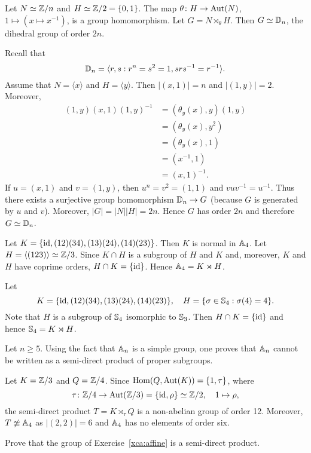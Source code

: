 \begin{example}
Let $N\simeq \mathbb{Z}/n$ and $H\simeq\mathbb{Z}/2=\{0,1\}$. The map $\theta\colon H\to\operatorname{Aut}(N)$, 
$1\mapsto (x\mapsto x^{-1})$, is a group homomorphism. Let $G=N\rtimes_\theta H$.
Then $G\simeq\mathbb{D}_n$, the dihedral group of order $2n$.

Recall that 
\[
\mathbb{D}_n=\langle r,s:r^n=s^2=1, srs^{-1}=r^{-1}\rangle.
\]
Assume that $N=\langle x\rangle$ and $H=\langle y\rangle$. Then $|(x,1)|=n$ and $|(1,y)|=2$. 
Moreover,
\begin{align*}
(1,y)(x,1)(1,y)^{-1} &= (\theta_y(x),y)(1,y)\\
&=(\theta_y(x),y^2)\\
&=(\theta_y(x),1)\\
&=(x^{-1},1)\\
&=(x,1)^{-1}.
\end{align*}
If $u=(x,1)$ and $v=(1,y)$, then $u^n=v^2=(1,1)$ and $vuv^{-1}=u^{-1}$. Thus there exists 
a surjective group homomorphism 
$\mathbb{D}_n\to G$ (because $G$ is generated by $u$ and $v$). Moreover, $|G|=|N||H|=2n$. Hence 
$G$ has order $2n$ and therefore $G\simeq\mathbb{D}_n$.
\end{example}

\begin{example}
Let $K=\{\operatorname{id},(12)(34),(13)(24),(14)(23)\}$. Then $K$ is normal in $\mathbb{A}_4$. 
Let $H=\langle (123)\rangle\simeq\mathbb{Z}/3$. Since $K\cap H$ is a subgroup of $H$ and $K$ and, moreover, 
$K$ and $H$ have coprime orders, $H\cap K=\{\operatorname{id}\}$. Hence $\mathbb{A}_4=K\rtimes H$.
\end{example}

\begin{example}
Let 
\[
K=\{\operatorname{id},(12)(34),(13)(24),(14)(23)\},\quad  
H=\{\sigma\in\mathbb{S}_4:\sigma(4)=4\}.
\]
Note that $H$ is a subgroup of 
$\mathbb{S}_4$ isomorphic to $\mathbb{S}_3$. Then $H\cap K=\{\operatorname{id}\}$ and hence 
$\mathbb{S}_4=K\rtimes H$.
\end{example}

Let $n\geq5$. 
Using the fact that $\mathbb{A}_n$ is a simple group,  
one proves that $\mathbb{A}_n$ cannot be written as a semi-direct product of proper subgroups. 

\begin{example}
Let $K=\mathbb{Z}/3$ and $Q=\mathbb{Z}/4$. Since $\operatorname{Hom}(Q,\operatorname{Aut}(K))=\{1,\tau\}$, where 
\[
\tau\colon\mathbb{Z}/4\to\operatorname{Aut}(\mathbb{Z}/3)=\{\operatorname{id},\rho\}\simeq\mathbb{Z}/2,\quad 1\mapsto\rho,
\]
the semi-direct product $T=K\rtimes_\tau Q$ is a non-abelian group of order 12. Moreover,
$T\not\simeq\mathbb{A}
_4$ as $|(2,2)|=6$ and $\mathbb{A}_4$ has no elements of order six.
\end{example}


\begin{exercise}
    \label{xca:affine_semidirect}
    Prove that the group of Exercise~\ref{xca:affine} is a semi-direct product. 
\end{exercise}

